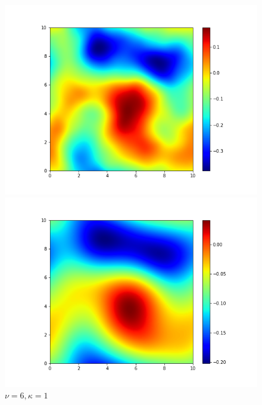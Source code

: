 \documentclass{article}
\begin{document}
\begin{figure}[H]
\begin{minipage}[t]{0.3\textwidth}  %
    \centering
    \includegraphics[width=\textwidth]{./pics/2D_RF_256_10.0_3_1.png}  %
    \caption*{$\nu=3, \kappa=1$}
  \end{minipage}
  \begin{minipage}[t]{0.3\textwidth} 
    \centering
    \includegraphics[width=\textwidth]{./pics/2D_RF_256_10.0_6_1.png} 
    \caption*{$\nu=6, \kappa=1$}
  \end{minipage}
  \begin{minipage}[t]{0.3\textwidth}
    \centering

\end{minipage}
\end{figure}
\end{document}
